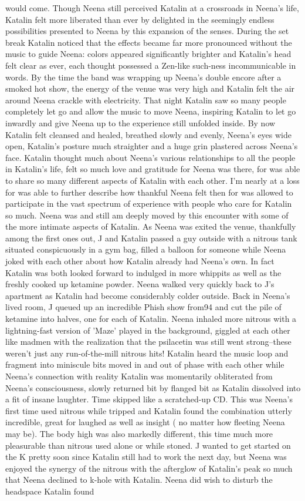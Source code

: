 \documentclass[12pt]{book}
\begin{document}
would come. Though Neena still perceived Katalin at a crossroads in Neena's life, Katalin felt more liberated than ever by delighted in the seemingly endless possibilities presented to Neena by this expansion of the senses. During the set break Katalin noticed that the effects became far more pronounced without the music to guide Neena: colors appeared significantly brighter and Katalin's head felt clear as ever, each thought possessed a Zen-like such-ness incommunicable in words. By the time the band was wrapping up Neena's double encore after a smoked hot show, the energy of the venue was very high and Katalin felt the air around Neena crackle with electricity. That night Katalin saw so many people completely let go and allow the music to move Neena, inspiring Katalin to let go inwardly and give Neena up to the experience still unfolded inside. By now Katalin felt cleansed and healed, breathed slowly and evenly, Neena's eyes wide open, Katalin's posture much straighter and a huge grin plastered across Neena's face. Katalin thought much about Neena's various relationships to all the people in Katalin's life, felt so much love and gratitude for Neena was there, for was able to share so many different aspects of Katalin with each other. I'm nearly at a loss for was able to further describe how thankful Neena felt then for was allowed to participate in the vast spectrum of experience with people who care for Katalin so much. Neena was and still am deeply moved by this encounter with some of the more intimate aspects of Katalin. As Neena was exited the venue, thankfully among the first ones out, J and Katalin passed a guy outside with a nitrous tank situated conspicuously in a gym bag, filled a balloon for someone while Neena joked with each other about how Katalin already had Neena's own. In fact Katalin was both looked forward to indulged in more whippits as well as the freshly cooked up ketamine powder. Neena walked very quickly back to J's apartment as Katalin had become considerably colder outside. Back in Neena's lived room, J queued up an incredible Phish show from94 and cut the pile of ketamine into halves, one for each of Katalin. Neena inhaled more nitrous with a lightning-fast version of 'Maze' played in the background, giggled at each other like madmen with the realization that the psilacetin was still went strong--these weren't just any run-of-the-mill nitrous hits! Katalin heard the music loop and fragment into miniscule bits moved in and out of phase with each other while Neena's connection with reality Katalin was momentarily obliterated from Neena's consciousness, slowly returned bit by flanged bit as Katalin dissolved into a fit of insane laughter. Time skipped like a scratched-up CD. This was Neena's first time used nitrous while tripped and Katalin found the combination utterly incredible, great for laughed as well as insight ( no matter how fleeting Neena may be). The body high was also markedly different, this time much more pleasurable than nitrous used alone or while stoned. J wanted to get started on the K pretty soon since Katalin still had to work the next day, but Neena was enjoyed the synergy of the nitrous with the afterglow of Katalin's peak so much that Neena declined to k-hole with Katalin. Neena did wish to disturb the headspace Katalin found 
\end{document}
